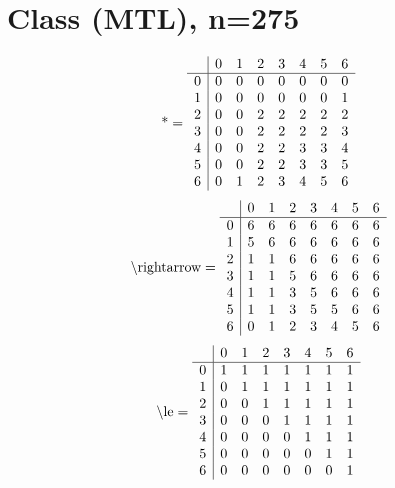 \documentclass[11pt]{article}
\begin{document}
\section{Class (MTL), n=275}
\[\text{*} = 
\begin{array}{r | r r r r r r r}
 & 0 & 1 & 2 & 3 & 4 & 5 & 6 \\ \hline
0 & 0 & 0 & 0 & 0 & 0 & 0 & 0 \\
1 & 0 & 0 & 0 & 0 & 0 & 0 & 1 \\
2 & 0 & 0 & 2 & 2 & 2 & 2 & 2 \\
3 & 0 & 0 & 2 & 2 & 2 & 2 & 3 \\
4 & 0 & 0 & 2 & 2 & 3 & 3 & 4 \\
5 & 0 & 0 & 2 & 2 & 3 & 3 & 5 \\
6 & 0 & 1 & 2 & 3 & 4 & 5 & 6 \\
\end{array}
\]
\[\text{\textbackslash rightarrow} = 
\begin{array}{r | r r r r r r r}
 & 0 & 1 & 2 & 3 & 4 & 5 & 6 \\ \hline
0 & 6 & 6 & 6 & 6 & 6 & 6 & 6 \\
1 & 5 & 6 & 6 & 6 & 6 & 6 & 6 \\
2 & 1 & 1 & 6 & 6 & 6 & 6 & 6 \\
3 & 1 & 1 & 5 & 6 & 6 & 6 & 6 \\
4 & 1 & 1 & 3 & 5 & 6 & 6 & 6 \\
5 & 1 & 1 & 3 & 5 & 5 & 6 & 6 \\
6 & 0 & 1 & 2 & 3 & 4 & 5 & 6 \\
\end{array}
\]
\[\text{\textbackslash le} = 
\begin{array}{r | r r r r r r r}
 & 0 & 1 & 2 & 3 & 4 & 5 & 6 \\ \hline
0 & 1 & 1 & 1 & 1 & 1 & 1 & 1 \\
1 & 0 & 1 & 1 & 1 & 1 & 1 & 1 \\
2 & 0 & 0 & 1 & 1 & 1 & 1 & 1 \\
3 & 0 & 0 & 0 & 1 & 1 & 1 & 1 \\
4 & 0 & 0 & 0 & 0 & 1 & 1 & 1 \\
5 & 0 & 0 & 0 & 0 & 0 & 1 & 1 \\
6 & 0 & 0 & 0 & 0 & 0 & 0 & 1 \\
\end{array}
\]
\end{document}
